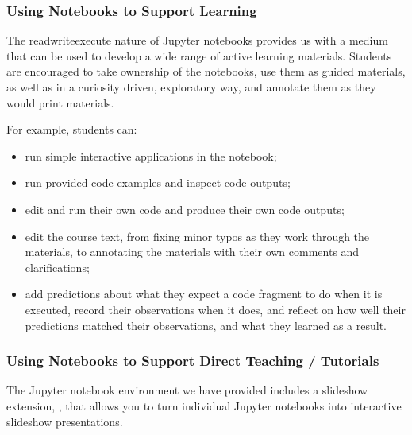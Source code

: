 \documentclass[letterpaper,10pt,english]{sphinxmanual}
\begin{document}
\subsubsection{Using Notebooks to Support Learning}
\label{\detokenize{content/00_NOTES_FOR_TUTORS/GETTING_STARTED:Using-Notebooks-to-Support-Learning}}
The read\sphinxhyphen{}write\sphinxhyphen{}execute nature of Jupyter notebooks provides us with a medium that can be used to develop a wide range of active learning materials. Students are encouraged to take ownership of the notebooks, use them as guided materials, as well as in a curiosity driven, exploratory way, and annotate them as they would print materials.

For example, students can:
\begin{itemize}
\item {} 
run simple interactive applications in the notebook;

\end{itemize}
\begin{itemize}
\item {} 
run provided code examples and inspect code outputs;

\end{itemize}
\begin{itemize}
\item {} 
edit and run their own code and produce their own code outputs;

\end{itemize}
\begin{itemize}
\item {} 
edit the course text, from fixing minor typos as they work through the materials, to annotating the materials with their own comments and clarifications;

\end{itemize}
\begin{itemize}
\item {} 
add predictions about what they expect a code fragment to do when it is executed, record their observations when it does, and reflect on how well their predictions matched their observations, and what they learned as a result.

\end{itemize}


\subsubsection{Using Notebooks to Support Direct Teaching / Tutorials}
\label{\detokenize{content/00_NOTES_FOR_TUTORS/GETTING_STARTED:Using-Notebooks-to-Support-Direct-Teaching-/-Tutorials}}
The Jupyter notebook environment we have provided includes a slideshow extension, , that allows you to turn individual Jupyter notebooks into interactive slideshow presentations.
\end{document}
